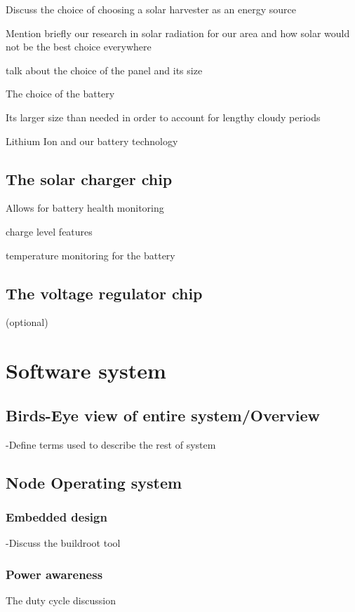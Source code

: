 \documentclass[10pt,conference]{IEEEtran}
\begin{document}
Discuss the choice of choosing a solar harvester as an energy source

Mention briefly our research in solar radiation for our area and how solar would not be the best choice everywhere

talk about the choice of the panel and its size

The choice of the battery

Its larger size than needed in order to account for lengthy cloudy periods 

Lithium Ion and our battery technology 

\subsection{The solar charger chip}

Allows for battery health monitoring

charge level features

temperature monitoring for the battery

\subsection{The voltage regulator chip }(optional)







\section{Software system}

	\subsection{Birds-Eye view of entire system/Overview}
		-Define terms used to describe the rest of system
	\subsection{Node Operating system}
		\subsubsection{Embedded design}
		-Discuss the buildroot tool
		\subsubsection{Power awareness}
The duty cycle discussion
\end{document}
